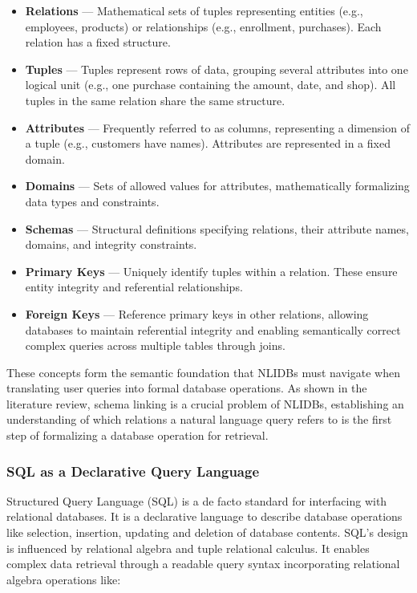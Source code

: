 \begin{itemize}
    \item \textbf{Relations} — Mathematical sets of tuples representing
        entities (e.g., employees, products) or relationships (e.g.,
        enrollment, purchases). Each relation has a fixed structure.
    \item \textbf{Tuples} — Tuples represent rows of data, grouping several
        attributes into one logical unit (e.g., one purchase containing the
        amount, date, and shop). All tuples in the same relation share the same
        structure.
    \item \textbf{Attributes} — Frequently referred to as columns, representing
        a dimension of a tuple (e.g., customers have names). Attributes are
        represented in a fixed domain.
    \item \textbf{Domains} — Sets of allowed values for attributes,
        mathematically formalizing data types and constraints.
    \item \textbf{Schemas} — Structural definitions specifying relations, their
        attribute names, domains, and integrity constraints.
    \item \textbf{Primary Keys} — Uniquely identify tuples within a relation.
        These ensure entity integrity and referential relationships.
    \item \textbf{Foreign Keys} — Reference primary keys in other relations,
        allowing databases to maintain referential integrity and enabling
        semantically correct complex queries across multiple tables through
        joins.
\end{itemize}

These concepts form the semantic foundation that NLIDBs must navigate when
translating user queries into formal database operations. As shown in the
literature review, schema linking is a crucial problem of NLIDBs, establishing
an understanding of which relations a natural language query refers to is the
first step of formalizing a database operation for retrieval.

\subsubsection{SQL as a Declarative Query Language}

Structured Query Language (SQL) is a de facto standard for interfacing with
relational databases. It is a declarative language to describe database
operations like selection, insertion, updating and deletion of database
contents. SQL's design is influenced by relational algebra and tuple relational
calculus. It enables complex data retrieval through a readable query syntax
incorporating relational algebra operations like:

